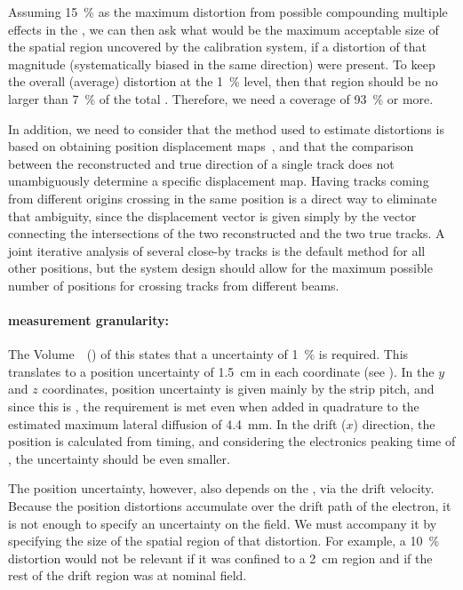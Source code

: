 Assuming \SI{15}{\%} as the maximum \efield distortion from possible compounding multiple  effects in the  ,
we can then ask what would be the maximum acceptable size of the spatial region uncovered by the calibration system, if a distortion of that magnitude (systematically biased in the same direction) were present. To keep the overall (average) \efield distortion at the \SI{1}{\%} level, then that region should be no larger than \SI{7}{\%} of the total . Therefore, we need a coverage of \SI{93}{\%} or more.

In addition, we need to consider that the method used to estimate \efield distortions is based on obtaining position displacement maps~\cite{bib:uBlaser2019}, and that the comparison between the reconstructed and true direction of a single track does not %
unambiguously determine a specific displacement map. Having tracks coming from different origins crossing in the same position is a direct way to eliminate that ambiguity, since the displacement vector is given simply by the vector connecting the intersections of the two reconstructed and the two true tracks. A joint iterative analysis of several close-by tracks is the default method for all other positions, but the system design should allow for the maximum possible number of positions %
for crossing tracks from different beams.


\paragraph{\efield measurement granularity:}

The Volume~\volnumberphysics~(\voltitlephysics) of this  states that a  uncertainty of \SI{1}{\%} is required. 
This translates to a position uncertainty of \SI{1.5}{\cm} in each coordinate (see  \spchapa). 
In the $y$ and $z$ coordinates, position uncertainty is given mainly by the  strip pitch, and since this is \dpstrippitch, the requirement is met even when added in quadrature to the estimated maximum lateral diffusion of \SI{4.4}{\milli\m}. In the drift ($x$) direction, the position is calculated from timing, and considering the electronics peaking time of \fepeaktime, the uncertainty should be even smaller.

The position uncertainty, however, also depends on the \efield, via the drift velocity. Because the position distortions accumulate over the drift path of the electron, it is not enough to specify an uncertainty on the field. We must accompany it by specifying the size of the spatial region of that distortion. For example, a \SI{10}{\%} distortion would not be relevant if it was confined to a \SI{2}{\cm} region and if the rest of the drift region was at nominal field.

